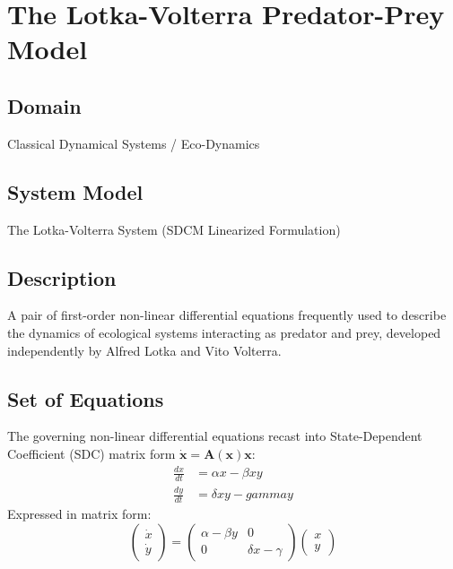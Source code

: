 \chapter{The Lotka-Volterra Predator-Prey Model}

\section{Domain}
Classical Dynamical Systems / Eco-Dynamics

\section{System Model}
The Lotka-Volterra System (SDCM Linearized Formulation)

\section{Description}
A pair of first-order non-linear differential equations frequently used to describe the dynamics of ecological systems interacting as predator and prey, developed independently by Alfred Lotka and Vito Volterra.

\section{Set of Equations}
The governing non-linear differential equations recast into State-Dependent Coefficient (SDC) matrix form $\dot{\mathbf{x}} = \mathbf{A}(\mathbf{x})\mathbf{x}$:
\begin{align}
\frac{dx}{dt} &= \alpha x - \beta x y \\
\frac{dy}{dt} &= \delta x y - gamma y
\end{align}
Expressed in matrix form:
\begin{equation}
\begin{pmatrix} \dot{x} \\ \dot{y} \end{pmatrix} = \begin{pmatrix} \alpha - \beta y & 0 \\ 0 & \delta x - \gamma \end{pmatrix} \begin{pmatrix} x \\ y \end{pmatrix}
\end{equation}


